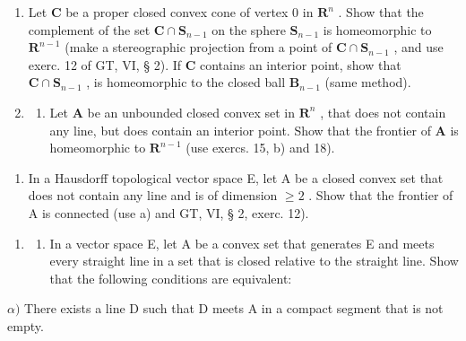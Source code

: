 \begin{enumerate}
\def\labelenumi{\arabic{enumi})}
\setcounter{enumi}{17}
\item
  Let \(\mathbf{C}\) be a proper closed convex cone of vertex 0 in \(\mathbf{R}^n\) . Show that the complement of the set \(\mathbf{C} \cap \mathbf{S}_{n-1}\) on the sphere \(\mathbf{S}_{n-1}\) is homeomorphic to \(\mathbf{R}^{n-1}\) (make a stereographic projection from a point of \(\mathbf{C} \cap \mathbf{S}_{n-1}\) , and use exerc. 12 of GT, VI, § 2). If \(\mathbf{C}\) contains an interior point, show that \(\mathbf{C} \cap \mathbf{S}_{n-1}\) , is homeomorphic to the closed ball \(\mathbf{B}_{n-1}\) (same method).
\item
  \begin{enumerate}
  \def\labelenumii{\alph{enumii})}
  \tightlist
  \item
    Let \(\mathbf{A}\) be an unbounded closed convex set in \(\mathbf{R}^n\) , that does not contain any line, but does contain an interior point. Show that the frontier of \(\mathbf{A}\) is homeomorphic to \(\mathbf{R}^{n-1}\) (use exercs. 15, b) and 18).
  \end{enumerate}
\end{enumerate}

\begin{enumerate}
\def\labelenumi{\alph{enumi})}
\setcounter{enumi}{1}
\tightlist
\item
  In a Hausdorff topological vector space E, let A be a closed convex set that does not contain any line and is of dimension \(\geqslant 2\) . Show that the frontier of A is connected (use a) and GT, VI, § 2, exerc. 12).
\end{enumerate}

\begin{enumerate}
\def\labelenumi{\arabic{enumi})}
\setcounter{enumi}{19}
\tightlist
\item
  \begin{enumerate}
  \def\labelenumii{\alph{enumii})}
  \tightlist
  \item
    In a vector space E, let A be a convex set that generates E and meets every straight line in a set that is closed relative to the straight line. Show that the following conditions are equivalent:
  \end{enumerate}
\end{enumerate}

\(\alpha)\) There exists a line D such that D meets A in a compact segment that is not empty.

